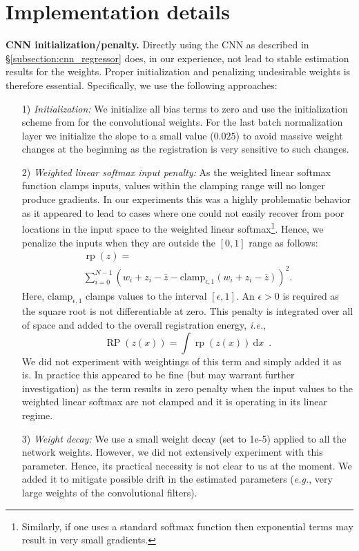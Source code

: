 \documentclass[10pt,twocolumn,letterpaper,table]{article}
\numberwithin{equation}{section}
\theoremstyle{plain}
\theoremstyle{definition}
\DeclareMathOperator{\rp}{rp}
\DeclareMathOperator{\RP}{RP}
\def\eg{\emph{e.g.}}  \def\Eg{\emph{E.g.}}
\def\ie{\emph{i.e.}}  \def\Ie{\emph{I.e.}}
\begin{document}
\section{Implementation details}
\label{sec:implementation_details}

\noindent
{\bf CNN initialization/penalty.} Directly using the CNN as described in \S\ref{subsection:cnn_regressor} does, in our experience, not lead to stable estimation results for the weights. Proper initialization and penalizing undesirable weights is therefore essential. Specifically, we use the following approaches:
\begin{itemize}
\item[1)] {\it Initialization:} We initialize all bias terms to zero and use the initialization scheme from \cite{He15a} for the convolutional weights. For the last batch normalization layer we initialize the slope to a small value ($0.025$) to avoid massive weight changes at the beginning as the registration is very sensitive to such changes.
\item[2)] {\it Weighted linear softmax input penalty:} As the  weighted linear softmax function clamps inputs, values within the clamping range will no longer produce gradients. In our experiments this was a highly problematic behavior as it appeared to lead to cases where one could not easily recover from poor locations in the input space to the weighted linear softmax\footnote{Similarly, if one uses a standard softmax function then exponential terms may result in very small gradients.}. Hence, we penalize the inputs when they are outside the $[0,1]$ range as follows:
  \begin{multline}
    \rp(z)=\\ \sum_{i=0}^{N-1}\left(w_i+z_i-\overline{z}-\text{clamp}_{\epsilon,1}(w_i+z_i-\overline{z})\right)^2.
  \end{multline}
  Here, $\text{clamp}_{\epsilon,1}$ clamps values to the interval $[\epsilon,1]$. An $\epsilon>0$ is required as the square root is not differentiable at zero. This penalty is integrated over all of space and added to the overall registration energy, \ie,
  \begin{equation}
    \RP(z(x)) = \int \rp(z(x))~\mathrm{d}x\enspace.\label{eq:pre_weight_input_range_penalty}
  \end{equation}
  We did not experiment with weightings of this term and simply added it as is. In practice this appeared to be fine (but may warrant further investigation) as the term results in zero penalty when the input values to the weighted linear softmax are not clamped and it is operating in its linear regime. 
\item[3)] {\it Weight decay:} We use a small weight decay \cite{Hanson88a} (set to 1e-5) applied to all the network weights. However, we did not extensively experiment with this parameter. Hence, its practical necessity is not clear to us at the moment. We added it to mitigate possible drift in the estimated parameters (\eg, very large weights of the convolutional filters). 
\end{itemize}
\end{document}
